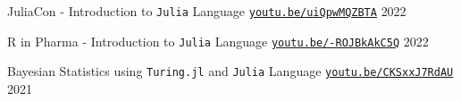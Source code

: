 

\begin{cventries}

	\cventry
	{} %
	{JuliaCon - Introduction to \texttt{Julia} Language} %
	{\href{https://youtu.be/uiQpwMQZBTA}{\texttt{youtu.be/uiQpwMQZBTA}}} %
	{2022} %
	{}

	\cventry
	{} %
	{R in Pharma - Introduction to \texttt{Julia} Language} %
	{\href{https://youtu.be/-ROJBkAkC5Q}{\texttt{youtu.be/-ROJBkAkC5Q}}} %
	{2022} %
	{}

	\cventry
	{} %
	{Bayesian Statistics using \texttt{Turing.jl} and \texttt{Julia} Language} %
	{\href{https://youtu.be/CKSxxJ7RdAU}{\texttt{youtu.be/CKSxxJ7RdAU}}} %
	{2021} %
	{}

\end{cventries}
